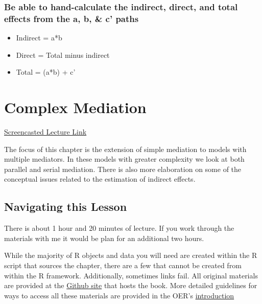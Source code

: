 \documentclass[
  11pt,
]{book}
\providecommand{\tightlist}{%
  \setlength{\itemsep}{0pt}\setlength{\parskip}{0pt}}
\begin{document}
\hypertarget{be-able-to-hand-calculate-the-indirect-direct-and-total-effects-from-the-a-b-c-paths}{%
\subsection*{Be able to hand-calculate the indirect, direct, and total effects from the a, b, \& c' paths}\label{be-able-to-hand-calculate-the-indirect-direct-and-total-effects-from-the-a-b-c-paths}}


\begin{itemize}
\tightlist
\item
  Indirect = a*b
\item
  Direct = Total minus indirect
\item
  Total = (a*b) + c'
\end{itemize}

\hypertarget{CompMed}{%
\chapter{Complex Mediation}\label{CompMed}}

\href{https://youtube.com/playlist?list=PLtz5cFLQl4KPxygMnwxro3FkuJj2rN6p-\&si=a7lIlFcLkMQzTc19}{Screencasted Lecture Link}

The focus of this chapter is the extension of simple mediation to models with multiple mediators. In these models with greater complexity we look at both parallel and serial mediation. There is also more elaboration on some of the conceptual issues related to the estimation of indirect effects.

\hypertarget{navigating-this-lesson-5}{%
\section{Navigating this Lesson}\label{navigating-this-lesson-5}}

There is about 1 hour and 20 minutes of lecture. If you work through the materials with me it would be plan for an additional two hours.

While the majority of R objects and data you will need are created within the R script that sources the chapter, there are a few that cannot be created from within the R framework. Additionally, sometimes links fail. All original materials are provided at the \href{https://https://github.com/lhbikos/ReC_MultivModel}{Github site} that hosts the book. More detailed guidelines for ways to access all these materials are provided in the OER's \href{https://lhbikos.github.io/ReCenterPsychStats/ReCintro.html\#introduction-to-the-data-set-used-for-homeworked-examples}{introduction}
\end{document}

